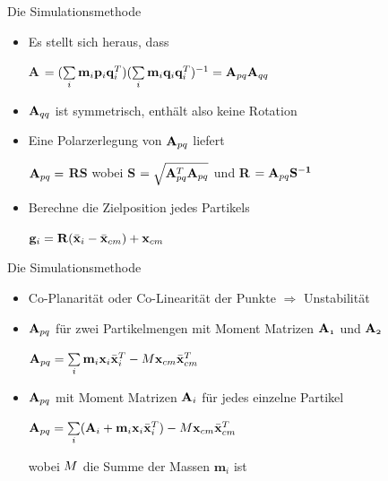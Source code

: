 \documentclass[t]{beamer}
\begin{document}
	\begin{frame}{Die Simulationsmethode}
		\begin{itemize}
			\item Es stellt sich heraus, dass
					\begin{center}
						\textbf{A} $=(\sum\limits_{\mathnormal{i}}\mathnormal{\mathbf{m}_i}\mathnormal{\mathbf{p}_i}\mathnormal{\mathbf{q}_i^T})(\sum\limits_{i}\mathnormal{\mathbf{m}_i}\mathnormal{\mathbf{q}_i}\mathnormal{\mathbf{q}_i^T})^{-1}=\mathnormal{\mathbf{A}}_{pq}\mathnormal{\mathbf{A}}_{qq}$
					\end{center}
			\item $\mathnormal{\mathbf{A}}_{qq}$ ist symmetrisch, enthält also keine Rotation
			\item Eine Polarzerlegung von $\mathnormal{\mathbf{A}}_{pq}$ liefert \\
					\begin{center}
						$\mathnormal{\mathbf{A}_{pq}}=$ \textbf{RS} wobei \textbf{S} $=\sqrt{\mathnormal{\mathbf{A}_{pq}^T} \mathnormal{\mathbf{A}_{pq}}}$ und \textbf{R} $=\mathnormal{\mathbf{A}_{pq}}\mathnormal{\mathbf{S^{-1}}}$
					\end{center}
			\item Berechne die Zielposition jedes Partikels
					\begin{center}
						$\mathnormal{\mathbf{g}_i}=\mathnormal{\mathbf{R}}(\mathnormal{\mathbf{\bar{x}}_i}-\mathnormal{\mathbf{\bar{x}}_{cm}})+\mathnormal{\mathbf{x}_{cm}}$ 
					\end{center}
		\end{itemize}
	\end{frame}

	\begin{frame}{Die Simulationsmethode}
		\begin{itemize}
			\item Co-Planarität oder Co-Linearität der Punkte $\Rightarrow$ Unstabilität
			\item $\mathnormal{\mathbf{A}}_{pq}$ für zwei Partikelmengen mit Moment Matrizen $\mathnormal{\mathbf{A}_1}$ und $\mathnormal{\mathbf{A}_2}$ 
				\begin{center}
					$\mathnormal{\mathbf{A}}_{pq}=\sum\limits_{i}\mathnormal{\mathbf{m}_i \mathbf{x}_i \mathbf{\bar{x}}^T_i}-M\mathnormal{\mathbf{x}_{cm} \mathbf{\bar{x}}_{cm}^T}$
				\end{center}
			\item $\mathnormal{\mathbf{A}}_{pq}$ mit Moment Matrizen $\mathnormal{\mathbf{A}_i}$ für jedes einzelne Partikel
				\begin{center}
					$\mathnormal{\mathbf{A}_{pq}}=\sum\limits_{i}(\mathnormal{\mathbf{A}_i}+\mathnormal{\mathbf{m}_i \mathbf{x}_i \mathbf{\bar{x}}_i^T})-M\mathnormal{\mathbf{x}_{cm} \mathbf{\bar{x}}_{cm}^T}$
				\end{center}
				wobei $\mathnormal{M}$ die Summe der Massen $\mathbf{m}_i$ ist
		\end{itemize}
	\end{frame}
\end{document}
